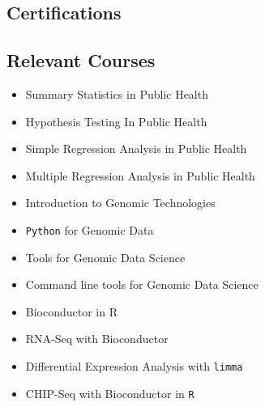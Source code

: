\documentclass[11pt,a4paper,sans]{moderncv}
\begin{document}
\subsection{Certifications}

\subsection{Relevant Courses}
\begin{multicols}{2}
	\begin{itemize}
		\item Summary Statistics in Public Health
		\item Hypothesis Testing In Public Health
		\item Simple Regression Analysis in Public Health
		\item Multiple Regression Analysis in Public Health
	\end{itemize}
\end{multicols}


\begin{multicols}{2}
	\begin{itemize}
		\item Introduction to Genomic Technologies
		\item \texttt{Python} for Genomic Data
		\item Tools for Genomic Data Science
		\item Command line tools for Genomic Data Science
	\end{itemize}
\end{multicols}




\begin{multicols}{2}
	\begin{itemize}
		\item Bioconductor in R
		\item RNA-Seq with Bioconductor
		\item Differential Expression Analysis with \texttt{limma}
		\item CHIP-Seq with Bioconductor in \texttt{R}
	\end{itemize}
\end{multicols}
  
\end{document}
